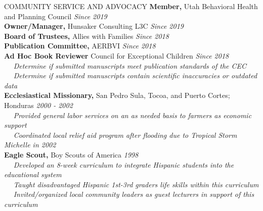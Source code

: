 \documentclass{resume} %
\begin{document}
\begin{rSection}{COMMUNITY SERVICE AND ADVOCACY}
	{\bf Member,} Utah Behavioral Health and Planning Council \hfill {\em Since 2019}
	\\{\bf Owner/Manager,} Hunsaker Consulting L3C \hfill {\em Since 2019}
	\\{\bf Board of Trustees,} Allies with Families \hfill {\em Since 2018}
	\\{\bf Publication Committee,} AERBVI \hfill {\em Since 2018}
	\\{\bf Ad Hoc Book Reviewer} Council for Exceptional Children \hfill {\em Since 2018}
    	\\ \textbullet~~ \textit{Determine if submitted manuscripts meet publication standards of the CEC}
	    \\ \textbullet~~ \textit{Determine if submitted manuscripts contain scientific inaccuracies or outdated data}
	\\{\bf Ecclesiastical Missionary,} San Pedro Sula, Tocoa, and Puerto Cortes; Honduras \hfill {\em 2000 - 2002}
        \\ \textbullet~~ \textit{Provided general labor services on an as needed basis to farmers as economic support}
        \\ \textbullet~~ \textit{Coordinated local relief aid program after flooding due to Tropical Storm Michelle in 2002}
	\\{\bf Eagle Scout,} Boy Scouts of America \hfill {\em 1998}
	    \\ \textbullet~~ \textit{Developed an 8-week curriculum to integrate Hispanic students into the educational system}
        \\ \textbullet~~ \textit{Taught disadvantaged Hispanic 1st-3rd graders life skills within this curriculum}
        \\ \textbullet~~ \textit{Invited/organized local community leaders as guest lecturers in support of this curriculum}
\end{rSection}
\end{document}
